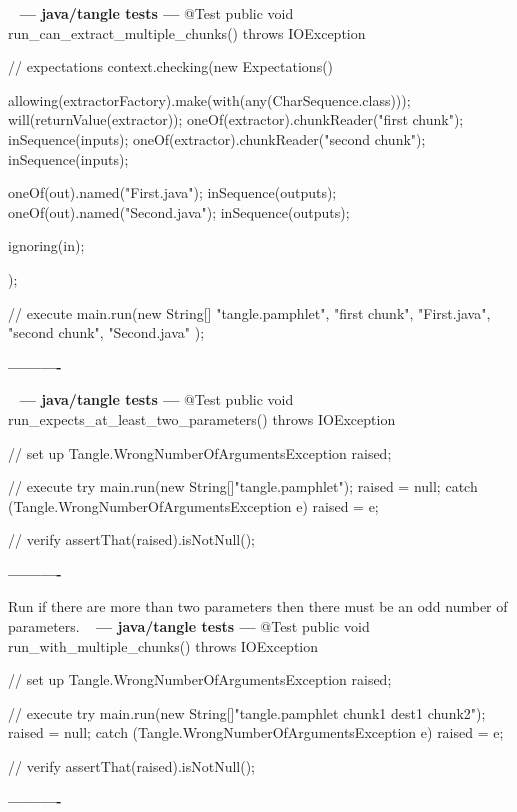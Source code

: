 \documentclass{book}
\newenvironment{chunk}[1]{%
{\ }\newline\noindent%
\hbox{\hskip 2.0cm}{\bf --- #1 ---}%
\verbatim}%                               say exactly what we see
{\endverbatim%
\par{}%
\noindent{}%
\hbox{\hskip 2.0cm}{\bf ----------}%
\par%
\normalsize\noindent}%
\begin{document}
\begin{chunk}{java/tangle tests}
@Test
public void run_can_extract_multiple_chunks() throws IOException {
    // expectations
    context.checking(new Expectations() {{
        allowing(extractorFactory).make(with(any(CharSequence.class)));
        will(returnValue(extractor));
        oneOf(extractor).chunkReader("first chunk");
        inSequence(inputs);
        oneOf(extractor).chunkReader("second chunk");
        inSequence(inputs);

        oneOf(out).named("First.java");
        inSequence(outputs);
        oneOf(out).named("Second.java");
        inSequence(outputs);

        ignoring(in);
    }});

    // execute
    main.run(new String[]{
            "tangle.pamphlet", 
            "first chunk", 
            "First.java", 
            "second chunk", 
            "Second.java"
    });
}
\end{chunk}

\begin{chunk}{java/tangle tests}
@Test
public void run_expects_at_least_two_parameters() throws IOException {
    // set up
    Tangle.WrongNumberOfArgumentsException raised;

    // execute
    try {
        main.run(new String[]{"tangle.pamphlet"});
        raised = null;
    } catch (Tangle.WrongNumberOfArgumentsException e) {
        raised = e;
    }

    // verify
    assertThat(raised).isNotNull();
}
\end{chunk}

Run if there are more than two parameters then there must be an odd number of parameters.
\begin{chunk}{java/tangle tests}
@Test
public void run_with_multiple_chunks() throws IOException {
    // set up
    Tangle.WrongNumberOfArgumentsException raised;

    // execute
    try {
        main.run(new String[]{"tangle.pamphlet chunk1 dest1 chunk2"});
        raised = null;
    } catch (Tangle.WrongNumberOfArgumentsException e) {
        raised = e;
    }

    // verify
    assertThat(raised).isNotNull();
}
\end{chunk}
\end{document}
